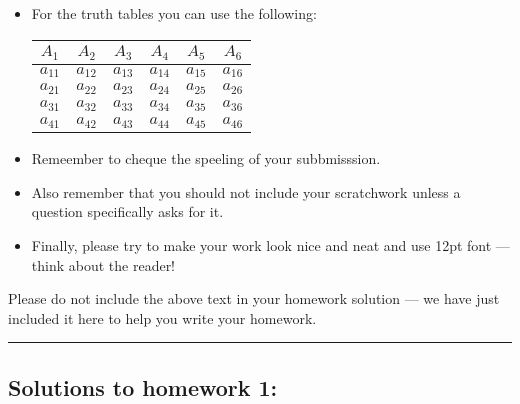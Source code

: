 \documentclass[letterpaper,12pt]{article}
\begin{document}
\begin{itemize}
  
  \item  For the truth tables you can use the following:
\begin{center}  %
\begin{tabular}{|c|c||c|c|c|c|} %
\hline %
$A_1$&$A_2$&$A_3$&$A_4$ & $A_5$ & $A_6$\\ %
\hline %
$a_{11}$&$a_{12}$&$a_{13}$&$a_{14}$&$a_{15}$&$a_{16}$\\ %
\hline %
$a_{21}$&$a_{22}$&$a_{23}$&$a_{24}$&$a_{25}$&$a_{26}$\\ %
\hline
$a_{31}$&$a_{32}$&$a_{33}$&$a_{34}$&$a_{35}$&$a_{36}$\\ %
\hline
$a_{41}$&$a_{42}$&$a_{43}$&$a_{44}$&$a_{45}$&$a_{46}$\\ %
\hline %
\end{tabular}
\end{center} %

\item Remeember to cheque the speeling of your subbmisssion.
\item Also remember that you should not include your scratchwork unless a question specifically asks for it.
\item Finally, please try to make your work look nice and neat and use 12pt font --- think about the reader!
\end{itemize}

Please do not include the above text in your homework solution --- we have just included it here to help you write your homework. 

\hrule

\subsection*{Solutions to homework 1:}
\end{document}
